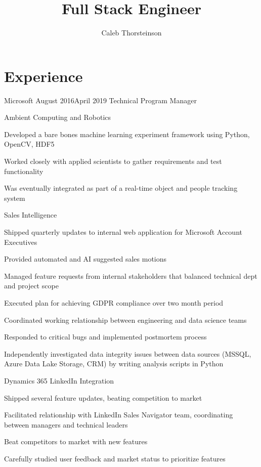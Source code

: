 \documentclass[]{resume}
\author{Caleb Thorsteinson}
\title{Full Stack Engineer}
\begin{document}
\raggedright


\section{Experience}

\begin{employer}{Microsoft} {August 2016}{April 2019}
  {Technical Program Manager}
\begin{team}{Ambient Computing and Robotics}
  \begin{bullets}
  \item Developed a bare bones
    machine learning experiment framework
    using Python, OpenCV, HDF5
  \item Worked closely with applied scientists
    to gather requirements
    and test functionality
  \item Was eventually integrated as part
    of a real-time object and people
    tracking system
  \end{bullets}
\end{team}
\begin{team}{Sales Intelligence}
  \begin{bullets}
  \item Shipped quarterly updates
    to internal web application for Microsoft Account Executives
  \item Provided automated and AI suggested sales motions
  \item Managed feature requests
    from internal stakeholders
    that balanced technical dept
    and project scope
  \item Executed plan for achieving GDPR compliance
    over two month period
  \item Coordinated working relationship
    between engineering and
    data science teams
  \item Responded to critical bugs
    and implemented postmortem process
  \item Independently investigated data integrity issues
    between data sources (MSSQL, Azure Data Lake Storage, CRM)
    by writing analysis scripts in Python
  \end{bullets}
\end{team}
\begin{team}{Dynamics 365 LinkedIn Integration}
  \begin{bullets}
  \item Shipped several feature updates,
    beating competition to market
  \item Facilitated relationship with LinkedIn Sales Navigator team,
    coordinating between managers
    and technical leaders
  \item Beat competitors to market with new features
  \item Carefully studied user feedback and
    market status to
    prioritize features
  \end{bullets}
\end{team}
\end{employer}
\end{document}
